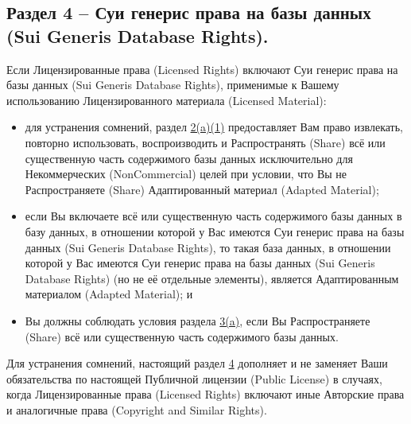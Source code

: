 \subsection*{Раздел 4 -- Суи генерис права на базы данных (Sui Generis Database Rights).}
Если Лицензированные права (Licensed Rights) включают Суи генерис права на базы данных (Sui Generis Database Rights), применимые к Вашему использованию Лицензированного материала (Licensed Material):
\begin{itemize}
\item[a.]
для устранения сомнений, раздел \href{https://creativecommons.org/licenses/by-nc-nd/4.0/legalcode#s2a1}{2(a)(1)} предоставляет Вам право извлекать, повторно использовать, воспроизводить и Распространять (Share) всё или существенную часть содержимого базы данных исключительно для Некоммерческих (NonCommercial) целей при условии, что Вы не Распространяете (Share) Адаптированный материал (Adapted Material);
\item[b.] если Вы включаете всё или существенную часть содержимого базы данных в базу данных, в отношении которой у Вас имеются Суи генерис права на базы данных (Sui Generis Database Rights), то такая база данных, в отношении которой у Вас имеются Суи генерис права на базы данных (Sui Generis Database Rights) (но не её отдельные элементы), является Адаптированным материалом (Adapted Material); и
\item[c.] Вы должны соблюдать условия раздела \href{https://creativecommons.org/licenses/by-nc-nd/4.0/legalcode#s3a}{3(a)}, если Вы Распространяете (Share) всё или существенную часть содержимого базы данных.
\end{itemize}
Для устранения сомнений, настоящий раздел \href{https://creativecommons.org/licenses/by-nc-nd/4.0/legalcode#s4}{4} дополняет и не заменяет Ваши обязательства по настоящей Публичной лицензии (Public License) в случаях, когда Лицензированные права (Licensed Rights) включают иные Авторские права и аналогичные права (Copyright and Similar Rights).

